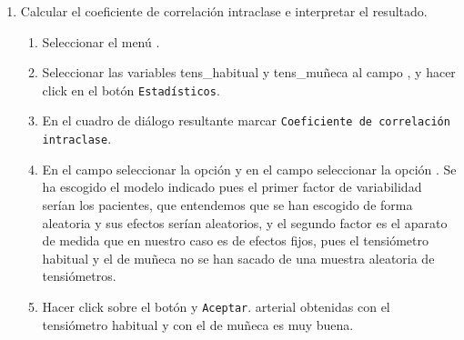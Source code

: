 \begin{enumerate}[leftmargin=*]
\begin{enumerate}
\item Calcular el coeficiente de correlación intraclase e interpretar el resultado.
\begin{indicacion}
\begin{enumerate}
\item Seleccionar el menú .
\item Seleccionar las variables \textsf{tens\_habitual} y \textsf{tens\_muñeca} al campo , y hacer click en el botón
\texttt{Estadísticos}.
\item En el cuadro de diálogo resultante marcar \texttt{Coeficiente de correlación intraclase}.
\item En el campo  seleccionar la opción  y en el campo  seleccionar la opción . Se ha escogido el modelo indicado pues el primer factor de variabilidad serían los pacientes, que entendemos que se han escogido de forma aleatoria y sus efectos serían aleatorios, y el segundo factor es el aparato de medida que en nuestro caso es de efectos fijos, pues el tensiómetro habitual y el de muñeca no se han sacado de una muestra aleatoria de tensiómetros.
\item Hacer click sobre el botón  y \texttt{Aceptar}.
 arterial obtenidas con el tensiómetro habitual y con el de muñeca es muy buena.
\end{enumerate}
\end{indicacion}


\end{enumerate}
\end{enumerate}
